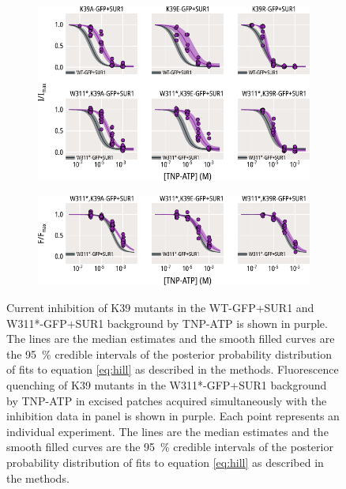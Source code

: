 \begin{figure}[hbtp]
	\centering
	\begin{subfigure}[t]{0.9\textwidth}
		\caption{}\label{ch5fig:k39_tnpatp_popfits_1}
		\centering
		\includegraphics[width=\textwidth]{k39_3.pdf}
	\end{subfigure}
	\vfill
	\begin{subfigure}[t]{0.9\textwidth}
		\caption{}\label{ch5fig:k39_tnpatp_popfits_2}
		\centering
		\includegraphics[width=\textwidth]{k39_4.pdf}
	\end{subfigure}
	\caption[Functional effects of K39 mutations on TNP-ATP binding and inhibition]{
	 Current inhibition of K39 mutants in the WT-GFP+SUR1 and W311*-GFP+SUR1 background by TNP-ATP is shown in purple.
	The lines are the median estimates and the smooth filled curves are the \SI{95}{\percent} credible intervals of the posterior probability distribution of fits to equation \ref{eq:hill} as described in the methods.
	 Fluorescence quenching of K39 mutants in the W311*-GFP+SUR1 background by TNP-ATP in excised patches acquired simultaneously with the inhibition data in panel  is shown in purple.
	Each point represents an individual experiment.
	The lines are the median estimates and the smooth filled curves are the \SI{95}{\percent} credible intervals of the posterior probability distribution of fits to equation \ref{eq:hill} as described in the methods.
	}\label{ch5fig:k39_1b}
\end{figure}

